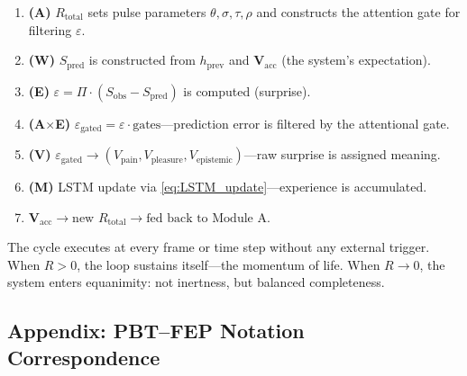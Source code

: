 \documentclass[12pt,a4paper]{article}
\newcommand{\Rtot}{R_{\mathrm{total}}}
\newcommand{\Vacc}{\mathbf{V}_{\mathrm{acc}}}
\newcommand{\Sobs}{S_{\mathrm{obs}}}
\newcommand{\Spred}{S_{\mathrm{pred}}}
\newcommand{\vpain}{V_{\mathrm{pain}}}
\newcommand{\vpleasure}{V_{\mathrm{pleasure}}}
\newcommand{\vepi}{V_{\mathrm{epistemic}}}
\begin{document}
\begin{enumerate}[leftmargin=1.8em]
  \item \textbf{(A)} $\Rtot$ sets pulse parameters $\theta,\sigma,\tau,\rho$
    and constructs the attention gate for filtering $\varepsilon$.
  \item \textbf{(W)} $\Spred$ is constructed from $h_{\mathrm{prev}}$ and
    $\Vacc$ (the system's expectation).
  \item \textbf{(E)} $\varepsilon = \Pi\cdot(\Sobs - \Spred)$ is computed
    (surprise).
  \item \textbf{(A$\times$E)} $\varepsilon_{\mathrm{gated}} =
    \varepsilon\cdot\mathrm{gates}$---prediction error is filtered by the
    attentional gate.
  \item \textbf{(V)} $\varepsilon_{\mathrm{gated}} \to
    (\vpain, \vpleasure, \vepi)$---raw surprise is assigned meaning.
  \item \textbf{(M)} LSTM update via \eqref{eq:LSTM_update}---experience is
    accumulated.
  \item $\Vacc\to\text{new }\Rtot\to\text{fed back to Module~A}$.
\end{enumerate}

The cycle executes at every frame or time step without any external trigger.
When $R > 0$, the loop sustains itself---the momentum of life. When $R\to 0$,
the system enters equanimity: not inertness, but balanced completeness.

\subsection{Appendix: PBT--FEP Notation Correspondence}
\label{app:fep_mapping}
\end{document}
